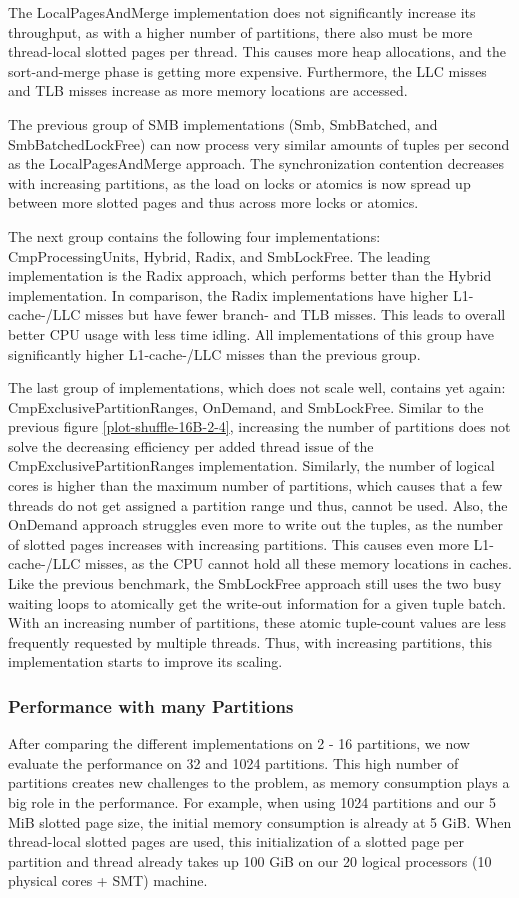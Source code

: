 The LocalPagesAndMerge implementation does not significantly increase its throughput, as with a higher number of partitions, there also must be more thread-local slotted pages per thread.
This causes more heap allocations, and the sort-and-merge phase is getting more expensive.
Furthermore, the \ac{LLC} misses and \ac{TLB} misses increase as more memory locations are accessed.

The previous group of SMB implementations (Smb, SmbBatched, and SmbBatchedLockFree) can now process very similar amounts of tuples per second as the LocalPagesAndMerge approach.
The synchronization contention decreases with increasing partitions, as the load on locks or atomics is now spread up between more slotted pages and thus across more locks or atomics.

The next group contains the following four implementations: CmpProcessingUnits, Hybrid, Radix, and SmbLockFree.
The leading implementation is the Radix approach, which performs better than the Hybrid implementation.
In comparison, the Radix implementations have higher L1-cache-/LLC misses but have fewer branch- and TLB misses.
This leads to overall better CPU usage with less time idling.
All implementations of this group have significantly higher L1-cache-/LLC misses than the previous group.

The last group of implementations, which does not scale well, contains yet again: CmpExclusivePartitionRanges, OnDemand, and SmbLockFree.
Similar to the previous figure \ref{plot-shuffle-16B-2-4}, increasing the number of partitions does not solve the decreasing efficiency per added thread issue of the CmpExclusivePartitionRanges implementation.
Similarly, the number of logical cores is higher than the maximum number of partitions, which causes that a few threads do not get assigned a partition range und thus, cannot be used.
Also, the OnDemand approach struggles even more to write out the tuples, as the number of slotted pages increases with increasing partitions.
This causes even more L1-cache-/LLC misses, as the \ac{CPU} cannot hold all these memory locations in caches.
Like the previous benchmark, the SmbLockFree approach still uses the two busy waiting loops to atomically get the write-out information for a given tuple batch.
With an increasing number of partitions, these atomic tuple-count values are less frequently requested by multiple threads.
Thus, with increasing partitions, this implementation starts to improve its scaling.
\subsubsection{Performance with many Partitions}
After comparing the different implementations on 2 - 16 partitions, we now evaluate the performance on 32 and 1024 partitions.
This high number of partitions creates new challenges to the problem, as memory consumption plays a big role in the performance.
For example, when using 1024 partitions and our 5 MiB slotted page size, the initial memory consumption is already at 5 GiB.
When thread-local slotted pages are used, this initialization of a slotted page per partition and thread already takes up 100 GiB on our 20 logical processors (10 physical cores + SMT) machine.

